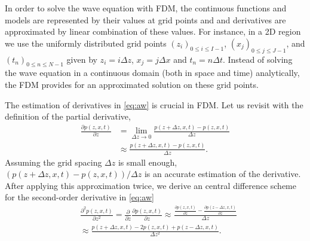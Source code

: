 \documentclass[11pt,titlepage]{article}
\theoremstyle{plain}
\theoremstyle{definition}
\theoremstyle{remark}
\numberwithin{equation}{section}
\begin{document}
In order to solve the wave equation with FDM, the continuous functions and models are represented by their values at grid points and and derivatives are approximated by linear combination of these values. For instance, in a 2D region we use the uniformly distributed grid points $(z_i)_{0\le i \le I-1 }$, $(x_j)_{0\le j \le J-1}$, and $(t_n)_{0\le n \le N-1}$ given by $z_i = i\Delta z$, $x_j = j\Delta x$ and $t_n=n\Delta t$. Instead of solving the wave equation in a continuous domain (both in space and time) analytically, the FDM provides for an approximated solution on these grid points.  

The estimation of derivatives in \eqref{eq:aw} is crucial in FDM. Let us revisit with the definition of the partial derivative, 
 \begin{equation}
  \begin{aligned}
  \frac{\partial p(z, x, t)}{\partial z} &= \lim\limits_{\Delta z \rightarrow 0} \frac{p(z+\Delta z, x, t) - p(z, x, t)}{\Delta z}\\
  &\approx \frac{p(z+\Delta z, x, t) - p(z, x, t)}{\Delta z}.
  \end{aligned}
  \end{equation}
Assuming the grid spacing $\Delta z$ is small enough, $(p(z+\Delta z, x, t) - p(z, x, t))/\Delta z$ is an accurate estimation of the derivative. After applying this approximation twice, we derive an central difference scheme for the second-order derivative in \eqref{eq:aw}
  \begin{equation}
  \begin{aligned}
  &\frac{\partial^2 p(z, x, t)}{\partial z^2} = \frac{\partial}{\partial z}\frac{\partial p(z, x, t)}{\partial z} \approx \frac{\frac{\partial p(z, x, t)}{\partial z} - \frac{\partial p(z-\Delta z, x, t)}{\partial z}}{\Delta z}\\
  &\approx \frac{p(z+\Delta z, x, t) - 2p(z, x, t) + p(z-\Delta z, x, t)}{\Delta z^2}.
  \end{aligned}
  \end{equation}
  
\end{document}
